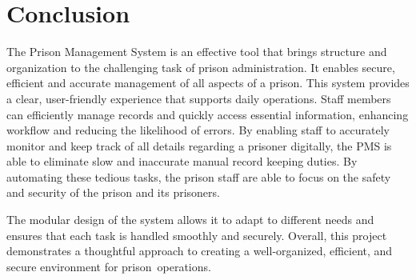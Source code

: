 \chapter{Conclusion}

The Prison Management System is an effective tool that brings structure and organization to the challenging task of prison administration. It enables secure, efficient and accurate management of all aspects of a prison. This system provides a clear, user-friendly experience that supports daily operations. Staff members can efficiently manage records and quickly access essential information, enhancing workflow and reducing the likelihood of errors. By enabling staff to accurately monitor and keep track of all details regarding a prisoner digitally, the PMS is able to eliminate slow and inaccurate manual record keeping duties. By automating these tedious tasks, the prison staff are able to focus on the safety and security of the prison and its prisoners.
 
The modular design of the system allows it to adapt to different needs and ensures that each task is handled smoothly and securely. Overall, this project demonstrates a thoughtful approach to creating a well-organized, efficient, and secure environment for prison operations.
